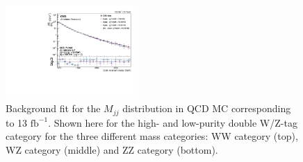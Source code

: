 \begin{figure}[h!]
\includegraphics[width=0.45\textwidth]{figures/analysis/search2/AN-16-235/plots/ZZLP_fitComp.pdf}
\caption{Background fit for the $M_{jj}$ distribution in QCD MC corresponding to 13 $\textrm{fb}^{-1}$. Shown here for the high- and low-purity double W/Z-tag category for the three different mass categories: WW category (top), WZ category (middle) and ZZ category (bottom).}
\label{fig:bkgfitQCD_VV}
\end{figure}

